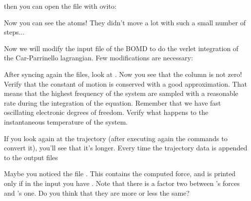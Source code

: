 \documentclass[landscape]{foils}
\begin{document}

then you can open the file  with ovito:


Now you can see the atoms! They didn't move a lot with such a small number of steps...


Now we will modify the input file of the BOMD to do the verlet integration of the Car-Parrinello lagrangian. Few modifications are necessary:

After syncing again the files, look at . Now you see that the  column is not zero! Verify that the constant of motion is conserved with a good approximation. That means that the highest frequency of the system are sampled with a reasonable rate during the integration of the equation. Remember that we have fast oscillating electronic degrees of freedom. Verify what happens to the instantaneous temperature of the system.

If you look again at the trajectory (after executing again the commands to convert it), you'll see that it's longer. Every time the trajectory data is appended to the output files 

Maybe you noticed the file . This contains the computed force, and is printed only if in the input you have . Note that there is a factor two between 's forces and 's one. Do you think that they are more or less the same?
\end{document}
